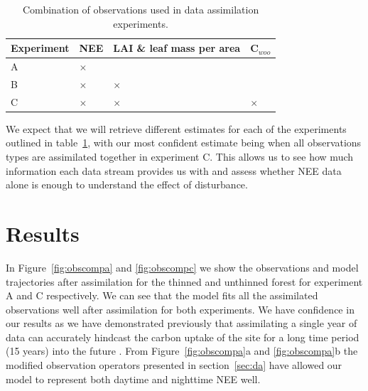\documentclass[draft,linenumbers]{agujournal}
\begin{document}
\begin{table}[ht] 
	\caption{Combination of observations used in data assimilation experiments.}
\begin{center}
	\begin{tabular}{| l | l | l | l |}
	\hline
	Experiment & NEE & LAI \& leaf mass per area & C\(_{woo}\) \\ \hline
	A & \(\times\) &  &  \\ \hline
	B & \(\times\) & \(\times\) &  \\ \hline
	C & \(\times\) & \(\times\) & \(\times\)  \\ \hline
	\end{tabular}
	\label{table:obs_da}
\end{center} 
\end{table}

We expect that we will retrieve different estimates for each of the experiments outlined in table~\ref{table:obs_da}, with our most confident estimate being when all observations types are assimilated together in experiment C. This allows us to see how much information each data stream provides us with and assess whether NEE data alone is enough to understand the effect of disturbance.

\section{Results} \label{sec:results}

In Figure~\ref{fig:obscompa} and \ref{fig:obscompc} we show the observations and model trajectories after assimilation for the  thinned and unthinned forest for experiment A and C respectively. We can see that the model fits all the assimilated observations well after assimilation for both experiments. We have confidence in our results as we have demonstrated previously that assimilating a single year of data can accurately hindcast the carbon uptake of the site for a long time period (15 years) into the future \citep{Pinnington2016299}. From Figure~\ref{fig:obscompa}a and \ref{fig:obscompa}b the modified observation operators presented in section~\ref{sec:da} have allowed our model to represent both daytime and nighttime NEE well. 
\end{document}
